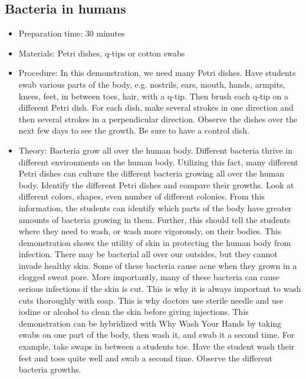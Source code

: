 \subsection{Bacteria in humans}
\begin{itemize}
\item{Preparation time: 30 minutes}
\item{Materials: Petri dishes, q-tips or cotton swabs}
\item{Procedure: In this demonstration, we need many Petri dishes. Have students swab various parts of the body, e.g. nostrils, ears, mouth, hands, armpits, knees, feet, in between toes, hair, with a q-tip. Then brush each q-tip on a different Petri dish. For each dish, make several strokes in one direction and then several strokes in a perpendicular direction. Observe the dishes over the next few days to see the growth. Be sure to have a control dish.}
\item{Theory: Bacteria grow all over the human body. Different bacteria thrive in different environments on the human body. Utilizing this fact, many different Petri dishes can culture the different bacteria growing all over the human body. Identify the different Petri dishes and compare their growths. Look at different colors, shapes, even number of different colonies. From this information, the students can identify which parts of the body have greater amounts of bacteria growing in them. Further, this should tell the students where they need to wash, or wash more vigorously, on their bodies. This demonstration shows the utility of skin in protecting the human body from infection. There may be bacterial all over our outsides, but they cannot invade healthy skin. Some of these bacteria cause acne when they grown in a clogged sweat pore. More importantly, many of these bacteria can cause serious infections if the skin is cut. This is why it is always important to wash cuts thoroughly with soap. This is why doctors use sterile needle and use iodine or alcohol to clean the skin before giving injections. This demonstration can be hybridized with Why Wash Your Hands by taking swabs on one part of the body, then wash it, and swab it a second time. For example, take swaps in between a students toe. Have the student wash their feet and toes quite well and swab a second time. Observe the different bacteria growths.}
\end{itemize}

